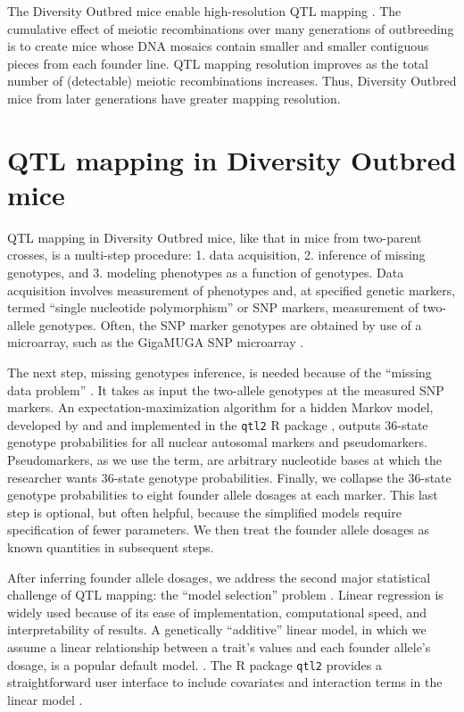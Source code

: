 \documentclass[oneside]{book}\usepackage[]{graphicx}\usepackage[]{color}
\begin{document}
 

The Diversity Outbred mice enable high-resolution QTL mapping 
\citep{gatti2014quantitative,broman2019rqtl2}. The cumulative effect of meiotic
recombinations over many generations of outbreeding is to create mice whose DNA
mosaics contain smaller and smaller contiguous pieces from each founder line. QTL
mapping resolution improves as the total number of (detectable) meiotic recombinations
increases. Thus, Diversity Outbred mice from later generations have greater mapping
resolution.


\section{QTL mapping in Diversity Outbred mice}\label{sec:do-qtl}

QTL mapping in Diversity Outbred mice, like that in mice from two-parent crosses, is a multi-step procedure: 1. data acquisition, 2. inference of missing genotypes, and 3. modeling phenotypes as a function of genotypes. Data acquisition involves measurement of phenotypes and, at specified genetic markers, termed ``single nucleotide polymorphism'' or SNP markers, measurement of two-allele genotypes. Often, the SNP marker genotypes are obtained by use of a microarray, such as the GigaMUGA SNP microarray \citep{morgan2015mouse}. 

The next step, missing genotypes inference, is needed because of the ``missing data problem'' \citep{broman2009guide}. It takes as input the two-allele genotypes at the measured SNP markers. An expectation-maximization algorithm \citep{dempster1977maximum} for a hidden Markov model, developed by \citet{broman2012haplotype} and \citet{broman2012genotype} and implemented in the \texttt{qtl2} R package \citep{broman2019rqtl2}, outputs 36-state genotype probabilities for all nuclear autosomal markers and pseudomarkers. Pseudomarkers, as we use the term, are arbitrary nucleotide bases at which the researcher wants 36-state genotype probabilities. Finally, we collapse the 36-state genotype probabilities to eight founder allele dosages at each marker. This last step is optional, but often helpful, because the simplified models require specification of fewer parameters. We then treat the founder allele dosages as known quantities in subsequent steps. 


After inferring founder allele dosages, we address the
second major statistical challenge of 
QTL mapping: the ``model selection'' problem \citep{broman2009guide}.
Linear regression is widely used because of its ease of implementation,
computational speed, and interpretability of results.
A genetically ``additive'' linear model, in which
we assume a linear relationship between
a trait's values and each founder allele's dosage, is a popular default model.
\citep{gatti2014quantitative,broman2019rqtl2}.
The R package \texttt{qtl2} provides a straightforward user
interface to include covariates and interaction terms in the linear 
model \citep{broman2019rqtl2}.
\end{document}
